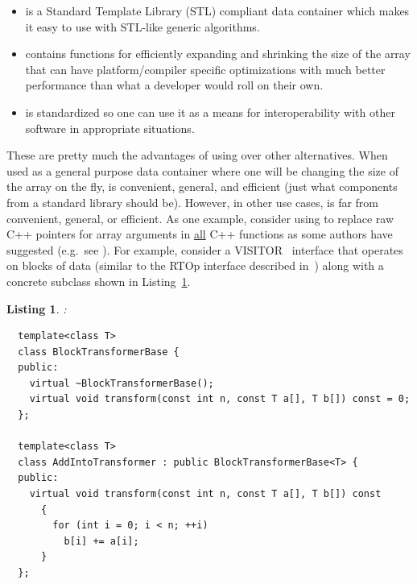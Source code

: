 \documentclass[pdf,ps2pdf,11pt]{SANDreport}
\newtheorem{listing}{Listing}
\begin{document}
\begin{itemize}

{}\item{} is a Standard Template Library (STL)
compliant data container which makes it easy to use with STL-like
generic algorithms.

{}\item{} contains functions for efficiently expanding
and shrinking the size of the array that can have platform/compiler
specific optimizations with much better performance than what a
developer would roll on their own.

{}\item{} is standardized so one can use it as a means
for interoperability with other software in appropriate situations.

\end{itemize}

These are pretty much the advantages of using {} over
other alternatives.  When used as a general purpose data container
where one will be changing the size of the array on the fly,
{} is convenient, general, and efficient (just what
components from a standard library should be).  However, in other use
cases, {} is far from convenient, general, or
efficient.  As one example, consider using {} to
replace raw C++ pointers for array arguments in {}\underline{all} C++
functions as some authors have suggested (e.g.\ see
{}\cite{Modernizing-the-C++-Interface-to-MPI}).  For example, consider
a VISITOR~\cite{ref:design_patterns_1995} interface that operates on
blocks of data (similar to the RTOp interface described
in~\cite{ref:rtop_toms}) along with a concrete subclass shown in
Listing~\ref{listing:addArrayIntoArray-raw}.

\begin{listing}:\\
\label{listing:addArrayIntoArray-raw}
{\small\begin{verbatim}
  template<class T>
  class BlockTransformerBase {
  public:
    virtual ~BlockTransformerBase();
    virtual void transform(const int n, const T a[], T b[]) const = 0;
  };

  template<class T>
  class AddIntoTransformer : public BlockTransformerBase<T> {
  public:
    virtual void transform(const int n, const T a[], T b[]) const
      {
        for (int i = 0; i < n; ++i)
          b[i] += a[i];
      }
  };
\end{verbatim}}
\end{listing}
\end{document}
